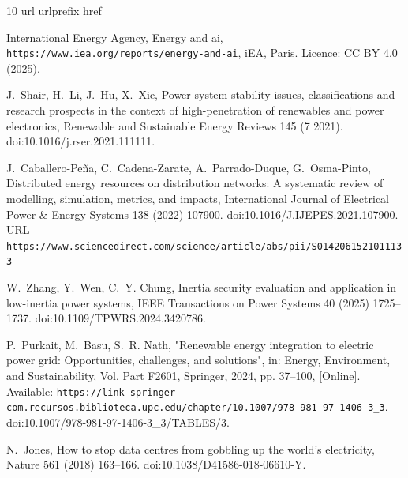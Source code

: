 \documentclass[preprint,12pt]{elsarticle}
\begin{document}
\begin{thebibliography}{10}
\expandafter\ifx\csname url\endcsname\relax
  \def\url#1{\texttt{#1}}\fi
\expandafter\ifx\csname urlprefix\endcsname\relax\def\urlprefix{URL }\fi
\expandafter\ifx\csname href\endcsname\relax
  \def\href#1#2{#2} \def\path#1{#1}\fi

{International Energy Agency}, Energy and ai,
  \url{https://www.iea.org/reports/energy-and-ai}, iEA, Paris. Licence: CC BY
  4.0 (2025).

J.~Shair, H.~Li, J.~Hu, X.~Xie, Power system stability issues, classifications
  and research prospects in the context of high-penetration of renewables and
  power electronics, Renewable and Sustainable Energy Reviews 145 (7 2021).
\newblock \href {https://doi.org/10.1016/j.rser.2021.111111}
  {\path{doi:10.1016/j.rser.2021.111111}}.

J.~Caballero-Peña, C.~Cadena-Zarate, A.~Parrado-Duque, G.~Osma-Pinto,
  \href{https://www.sciencedirect.com/science/article/abs/pii/S0142061521011133}{Distributed
  energy resources on distribution networks: A systematic review of modelling,
  simulation, metrics, and impacts}, International Journal of Electrical Power
  \& Energy Systems 138 (2022) 107900.
\newblock \href {https://doi.org/10.1016/J.IJEPES.2021.107900}
  {\path{doi:10.1016/J.IJEPES.2021.107900}}.
\newline\urlprefix\url{https://www.sciencedirect.com/science/article/abs/pii/S0142061521011133}

W.~Zhang, Y.~Wen, C.~Y. Chung, Inertia security evaluation and application in
  low-inertia power systems, IEEE Transactions on Power Systems 40 (2025)
  1725--1737.
\newblock \href {https://doi.org/10.1109/TPWRS.2024.3420786}
  {\path{doi:10.1109/TPWRS.2024.3420786}}.

P.~Purkait, M.~Basu, S.~R. Nath, {"Renewable energy integration to electric
  power grid: Opportunities, challenges, and solutions"}, in: Energy,
  Environment, and Sustainability, Vol. Part F2601, Springer, 2024, pp.
  37--100, [Online]. Available:
  \url{https://link-springer-com.recursos.biblioteca.upc.edu/chapter/10.1007/978-981-97-1406-3_3}.
\newblock \href {https://doi.org/10.1007/978-981-97-1406-3_3/TABLES/3}
  {\path{doi:10.1007/978-981-97-1406-3_3/TABLES/3}}.

N.~Jones, How to stop data centres from gobbling up the world's electricity,
  Nature 561 (2018) 163--166.
\newblock \href {https://doi.org/10.1038/D41586-018-06610-Y}
  {\path{doi:10.1038/D41586-018-06610-Y}}.


\end{thebibliography}
\end{document}
